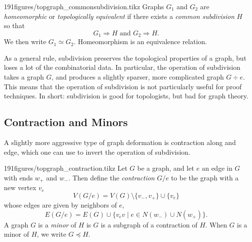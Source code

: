 \begin{claimfigureenv}[Homeomorphic]{191figures/topgraph_commonsubdivision.tikz}
Graphs $G_1$ and $G_2$ are \emph{homeomorphic} or \emph{topologically equivalent} if there exists a \emph{common subdivision} $H$ so that 
\[G_1\Rightarrow H \text{  and  } G_2\Rightarrow H.\]
We then write $G_1\simeq G_2$. 
Homeomorphism is an equivalence relation. 
\end{claimfigureenv}
\begin{comment}
Not all kinds of topological deformations are captured by the subdivision relation. Perhaps the most important of these relations is the homotopy equivalence, which is not characterized by subdivision. If we allow for homotopy-like deformations, then a graph is completely characterized by the number of independent loops it has, and so every graph can be homotoped to a graph with one vertex of high degree, and many other vertices of degree 2. However, subdivision preserves more properties than this:
\begin{claim}
Let $H$ be a subdivision of $G$. Then for every $k$, the number of vertices of $G$ of degree $k$ is equal to the number of vertices of $H$ of degree $k$. 
\end{claim}
\end{comment}
As a general rule, subdivision preserves the topological properties of a graph, but loses a lot of the combinatorial data. 
In particular, the operation of subdivision takes a graph $G$, and produces a slightly sparser, more complicated graph $G\div e$.
This means that the operation of subdivision is not particularly useful for proof techniques. 
In short: subdivision is good for topologists, but bad for graph theory.

\subsection{Contraction and Minors}
A slightly more aggressive type of graph deformation is contraction along and edge, which one can use to invert the operation of subdivision. 
\begin{definitionfigureenv}[Contraction]{191figures/topgraph_contraction.tikz}
  Let $G$ be a graph, and let $e$ an edge in $G$ with ends $w_+$ and $w_-$. Then define the \emph{contraction} $G/e$  to be the graph with a new vertex $v_e$ 
  \[
	  V(G/e)=V(G)\setminus \{v_-, v_+\}\cup\{v_e\}
\]
  whose edges are given by neighbors of $e$,
  \[
	  E(G/e)=E(G)\cup\{v_ev \;|\; e\in N(w_-)\cup N(w_+)\}.
	\]
   A graph $G$ is a  \emph{minor} of $H$ is $G$ is a subgraph of a contraction of $H$.
   When $G$ is a minor of $H$, we write $G\preceq H$. 
\end{definitionfigureenv}

